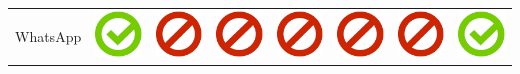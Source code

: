 \documentclass[10pt,foldmark,tumble]{leaflet}
\begin{document}
\begin{center}
{{\begin{tabular}{ L{2cm} | C{2cm} | C{2cm} | C{2cm} | C{2cm} | C{2cm} | C{2cm} | C{2cm} }
WhatsApp & \includegraphics[scale=0.1]{pics/haken.png} & \includegraphics[scale=0.1]{pics/nohaken.png} & \includegraphics[scale=0.1]{pics/nohaken.png} & \includegraphics[scale=0.1]{pics/nohaken.png} & \includegraphics[scale=0.1]{pics/nohaken.png} & \includegraphics[scale=0.1]{pics/nohaken.png} & \includegraphics[scale=0.1]{pics/haken.png} \tabularnewline

\end{tabular}}}
\end{center}
\end{document}
